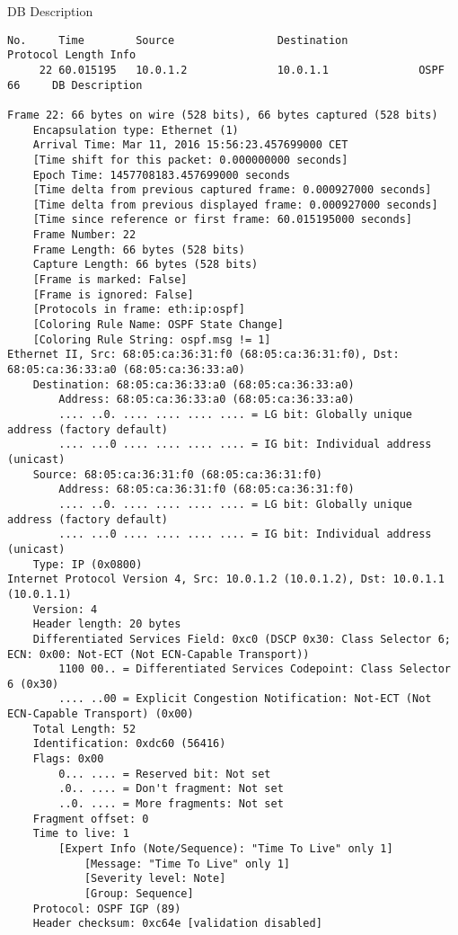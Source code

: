 DB Description
\begin{lstlisting}
No.     Time        Source                Destination           Protocol Length Info
     22 60.015195   10.0.1.2              10.0.1.1              OSPF     66     DB Description

Frame 22: 66 bytes on wire (528 bits), 66 bytes captured (528 bits)
    Encapsulation type: Ethernet (1)
    Arrival Time: Mar 11, 2016 15:56:23.457699000 CET
    [Time shift for this packet: 0.000000000 seconds]
    Epoch Time: 1457708183.457699000 seconds
    [Time delta from previous captured frame: 0.000927000 seconds]
    [Time delta from previous displayed frame: 0.000927000 seconds]
    [Time since reference or first frame: 60.015195000 seconds]
    Frame Number: 22
    Frame Length: 66 bytes (528 bits)
    Capture Length: 66 bytes (528 bits)
    [Frame is marked: False]
    [Frame is ignored: False]
    [Protocols in frame: eth:ip:ospf]
    [Coloring Rule Name: OSPF State Change]
    [Coloring Rule String: ospf.msg != 1]
Ethernet II, Src: 68:05:ca:36:31:f0 (68:05:ca:36:31:f0), Dst: 68:05:ca:36:33:a0 (68:05:ca:36:33:a0)
    Destination: 68:05:ca:36:33:a0 (68:05:ca:36:33:a0)
        Address: 68:05:ca:36:33:a0 (68:05:ca:36:33:a0)
        .... ..0. .... .... .... .... = LG bit: Globally unique address (factory default)
        .... ...0 .... .... .... .... = IG bit: Individual address (unicast)
    Source: 68:05:ca:36:31:f0 (68:05:ca:36:31:f0)
        Address: 68:05:ca:36:31:f0 (68:05:ca:36:31:f0)
        .... ..0. .... .... .... .... = LG bit: Globally unique address (factory default)
        .... ...0 .... .... .... .... = IG bit: Individual address (unicast)
    Type: IP (0x0800)
Internet Protocol Version 4, Src: 10.0.1.2 (10.0.1.2), Dst: 10.0.1.1 (10.0.1.1)
    Version: 4
    Header length: 20 bytes
    Differentiated Services Field: 0xc0 (DSCP 0x30: Class Selector 6; ECN: 0x00: Not-ECT (Not ECN-Capable Transport))
        1100 00.. = Differentiated Services Codepoint: Class Selector 6 (0x30)
        .... ..00 = Explicit Congestion Notification: Not-ECT (Not ECN-Capable Transport) (0x00)
    Total Length: 52
    Identification: 0xdc60 (56416)
    Flags: 0x00
        0... .... = Reserved bit: Not set
        .0.. .... = Don't fragment: Not set
        ..0. .... = More fragments: Not set
    Fragment offset: 0
    Time to live: 1
        [Expert Info (Note/Sequence): "Time To Live" only 1]
            [Message: "Time To Live" only 1]
            [Severity level: Note]
            [Group: Sequence]
    Protocol: OSPF IGP (89)
    Header checksum: 0xc64e [validation disabled]

\end{lstlisting}
